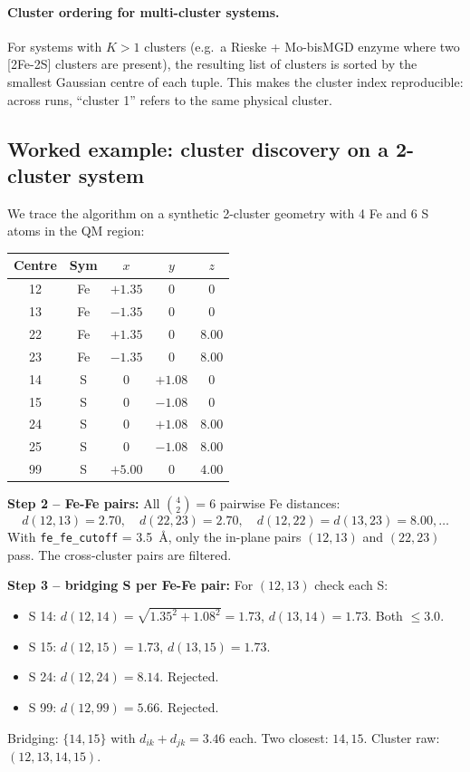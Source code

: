 \documentclass[10pt,a4paper,twoside]{article}
\newcommand{\cfgkey}[1]{\texttt{#1}}
\begin{document}
\paragraph{Cluster ordering for multi-cluster systems.}
For systems with $K > 1$ clusters (e.g.\ a Rieske + Mo-bisMGD enzyme
where two [2Fe-2S] clusters are present), the resulting list of
clusters is sorted by the smallest Gaussian centre of each tuple.
This makes the cluster index reproducible: across runs, ``cluster
1'' refers to the same physical cluster.

\subsection{Worked example: cluster discovery on a 2-cluster system}

We trace the algorithm on a synthetic 2-cluster geometry with 4 Fe
and 6 S atoms in the QM region:

\begin{center}
\begin{tabular}{ccccc}
\toprule
Centre & Sym & $x$ & $y$ & $z$ \\
\midrule
12 & Fe & $+1.35$  & $0$    & $0$    \\
13 & Fe & $-1.35$  & $0$    & $0$    \\
22 & Fe & $+1.35$  & $0$    & $8.00$ \\
23 & Fe & $-1.35$  & $0$    & $8.00$ \\
14 & S  & $0$      & $+1.08$ & $0$   \\
15 & S  & $0$      & $-1.08$ & $0$   \\
24 & S  & $0$      & $+1.08$ & $8.00$ \\
25 & S  & $0$      & $-1.08$ & $8.00$ \\
99 & S  & $+5.00$  & $0$    & $4.00$ \\
\bottomrule
\end{tabular}
\end{center}

\textbf{Step 2 -- Fe-Fe pairs:} All
$\binom{4}{2} = 6$ pairwise Fe distances:
\[
  d(12,13) = 2.70,\quad d(22,23) = 2.70,\quad
  d(12,22) = d(13,23) = 8.00, \dots
\]
With \cfgkey{fe\_fe\_cutoff} = 3.5~\AA{}, only the in-plane pairs
$(12, 13)$ and $(22, 23)$ pass. The cross-cluster pairs are filtered.

\textbf{Step 3 -- bridging S per Fe-Fe pair:}
For $(12, 13)$ check each S:
\begin{itemize}
  \item S 14: $d(12, 14) = \sqrt{1.35^2 + 1.08^2} = 1.73$,
        $d(13, 14) = 1.73$. Both $\leq 3.0$. \checkmark
  \item S 15: $d(12, 15) = 1.73$, $d(13, 15) = 1.73$. \checkmark
  \item S 24: $d(12, 24) = 8.14$. Rejected.
  \item S 99: $d(12, 99) = 5.66$. Rejected.
\end{itemize}
Bridging: $\{14, 15\}$ with $d_{ik} + d_{jk} = 3.46$ each. Two
closest: $14, 15$. Cluster raw: $(12, 13, 14, 15)$.
\end{document}
